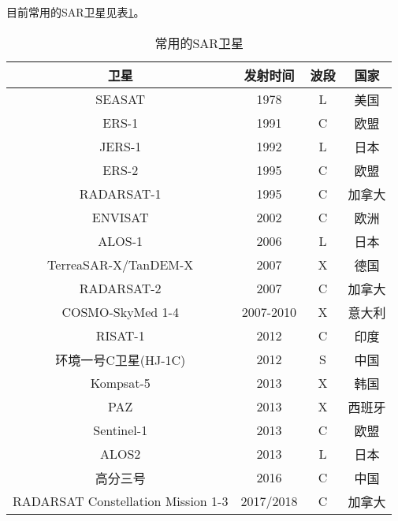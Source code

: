目前常用的SAR卫星见表\ref{tab:sarsatellite}。
\begin{table}
    \centering\small
    \begin{tabular}{@{}cccc@{}}
    \toprule
    卫星                                 & 发射时间      & 波段 & 国家  \\ \midrule
    SEASAT & 1978 & L & 美国 \\
    ERS-1 &1991 & C &欧盟 \\
    JERS-1 & 1992 & L & 日本 \\
    ERS-2 & 1995 & C & 欧盟 \\
    RADARSAT-1 & 1995 & C & 加拿大 \\
    ENVISAT & 2002 & C & 欧洲 \\
    ALOS-1 & 2006 & L & 日本 \\
    TerreaSAR-X/TanDEM-X               & 2007      & X  & 德国  \\
    RADARSAT-2                         & 2007      & C  & 加拿大 \\
    COSMO-SkyMed 1-4                   & 2007-2010 & X  & 意大利 \\
    RISAT-1                            & 2012      & C  & 印度  \\
    环境一号C卫星(HJ-1C)                     & 2012      & S  & 中国  \\
    Kompsat-5                          & 2013      & X  & 韩国  \\
    PAZ                                & 2013      & X  & 西班牙 \\
    Sentinel-1                         & 2013      & C  & 欧盟  \\
    ALOS2                              & 2013      & L  & 日本  \\
    高分三号                               & 2016      & C  & 中国  \\
    RADARSAT Constellation Mission 1-3 & 2017/2018 & C  & 加拿大 \\ \bottomrule
    \end{tabular}
    \caption{常用的SAR卫星}
    \label{tab:sarsatellite}
\end{table}

